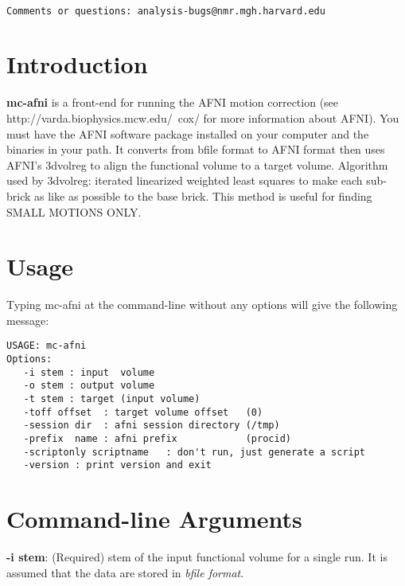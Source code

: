 \documentclass[10pt]{article}
\begin{document}
\begin{Large}
 \\
\end{Large}

\noindent 
\begin{verbatim}
Comments or questions: analysis-bugs@nmr.mgh.harvard.edu
\end{verbatim}

\section{Introduction}
{\bf mc-afni} is a front-end for running the AFNI motion correction
(see http://varda.biophysics.mcw.edu/~cox/ for more information about
AFNI). You must have the AFNI software package installed on your
computer and the binaries in your path.  It converts from bfile format
to AFNI format then uses AFNI's 3dvolreg to align the functional
volume to a target volume.  Algorithm used by 3dvolreg: iterated
linearized weighted least squares to make each sub-brick as like as
possible to the base brick.  This method is useful for finding SMALL
MOTIONS ONLY.  \\

\section{Usage}
Typing mc-afni at the command-line without any options will give the
following message:\\ 

\begin{small}
\begin{verbatim}
USAGE: mc-afni
Options:
   -i stem : input  volume 
   -o stem : output volume 
   -t stem : target (input volume)
   -toff offset  : target volume offset   (0)
   -session dir  : afni session directory (/tmp)
   -prefix  name : afni prefix            (procid)
   -scriptonly scriptname   : don't run, just generate a script
   -version : print version and exit
\end{verbatim}
\end{small}

\section{Command-line Arguments}

\noindent
{\bf -i stem}: (Required) stem of the input functional volume for a single run.
It is assumed that the data are stored in {\em bfile format}. \\
\end{document}
